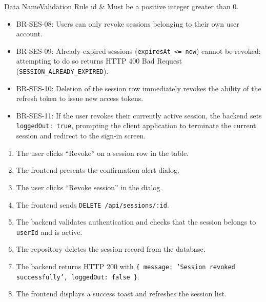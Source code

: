 \begin{specdatatable}{Data Name}{Validation Rule}
id & Must be a positive integer greater than 0.\\ \hline
\end{specdatatable}

\begin{itemize}[leftmargin=1.6em,topsep=3pt,itemsep=2pt,parsep=0pt,label=$\bullet$]\brrulelist
    \item BR-SES-08: Users can only revoke sessions belonging to their own user account.
    \item BR-SES-09: Already-expired sessions (\texttt{expiresAt <= now}) cannot be revoked; attempting to do so returns HTTP 400 Bad Request (\texttt{SESSION\_ALREADY\_EXPIRED}).
    \item BR-SES-10: Deletion of the session row immediately revokes the ability of the refresh token to issue new access tokens.
    \item BR-SES-11: If the user revokes their currently active session, the backend sets \texttt{loggedOut: true}, prompting the client application to terminate the current session and redirect to the sign-in screen.
\end{itemize}

\begin{enumerate}[leftmargin=1.6em,topsep=3pt,itemsep=2pt,parsep=0pt]
    \item The user clicks ``Revoke'' on a session row in the table.
    \item The frontend presents the confirmation alert dialog.
    \item The user clicks ``Revoke session'' in the dialog.
    \item The frontend sends \texttt{DELETE /api/sessions/:id}.
    \item The backend validates authentication and checks that the session belongs to \texttt{userId} and is active.
    \item The repository deletes the session record from the database.
    \item The backend returns HTTP 200 with \texttt{\{ message: 'Session revoked successfully', loggedOut: false \}}.
    \item The frontend displays a success toast and refreshes the session list.
\end{enumerate}


